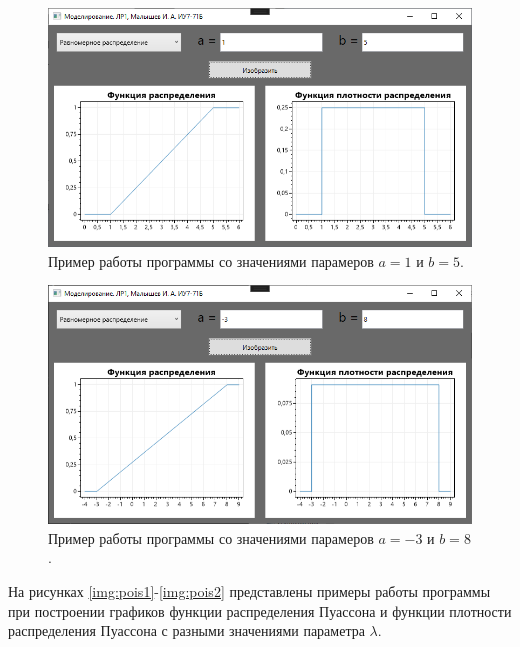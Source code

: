\documentclass[12pt]{report}
\begin{document}
\begin{figure}[H]
	\begin{center}
		\includegraphics[scale=0.6]{imgs/uni1.png}
	\end{center}
	\caption{Пример работы программы со значениями парамеров $a = 1$ и $b = 5$.}
	\label{img:uni1}
\end{figure}

\begin{figure}[H]
	\begin{center}
		\includegraphics[scale=0.6]{imgs/uni2.png}
	\end{center}
	\caption{Пример работы программы со значениями парамеров $a = -3$ и $b = 8$.}
	\label{img:uni2}
\end{figure}

На рисунках \ref{img:pois1}-\ref{img:pois2} представлены примеры работы программы при построении графиков функции распределения Пуассона и функции плотности распределения Пуассона с разными значениями параметра $\lambda$.
\end{document}
